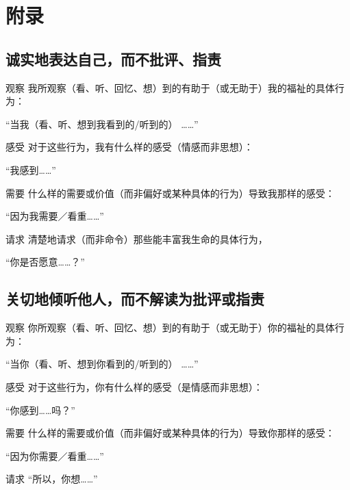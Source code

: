 \documentclass{ctexart}
\newcounter{edesc}
\begin{document}
\section{附录}

\subsection{诚实地表达自己，而不批评、指责}

\begin{edesc}[style=nextline]
	\item[观察]
	我所观察（看、听、回忆、想）到的有助于（或无助于）我的福祉的具体行为：

	``当我（看、听、想到我看到的/听到的） \ldots\ldots''
	\item[感受]
	对于这些行为，我有什么样的感受（情感而非思想）：

	``我感到\ldots\ldots''
	\item[需要]
	什么样的需要或价值（而非偏好或某种具体的行为）导致我那样的感受：

	``因为我需要／看重\ldots\ldots''
	\item[请求]
	清楚地请求（而非命令）那些能丰富我生命的具体行为，

	``你是否愿意\ldots\ldots？''
\end{edesc}


\subsection{关切地倾听他人，而不解读为批评或指责}

\begin{edesc}[style=nextline]
	\item[观察]
	      你所观察（看、听、回忆、想）到的有助于（或无助于）你的福祉的具体行为：

	      ``当你（看、听、想到你看到的/听到的） \ldots\ldots''
	\item[感受]
	      对于这些行为，你有什么样的感受（是情感而非思想）：

	      ``你感到\ldots\ldots 吗？''
	\item[需要]
	      什么样的需要或价值（而非偏好或某种具体的行为）导致你那样的感受：

	      ``因为你需要／看重\ldots\ldots''
	\item[请求]
	      ``所以，你想\ldots\ldots''
\end{edesc}
\end{document}
